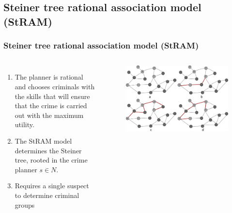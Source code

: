 \documentclass[aspectratio=169]{beamer}
\begin{document}
\subsection{Steiner tree rational association model (StRAM)}
\begin{frame}
\frametitle{Steiner tree rational association model (StRAM)}
  \begin{columns}
    \begin{enumerate}
      \item<1-> The planner is rational and chooses criminals with the skills that will ensure that the crime is carried out with the maximum utility.
      \item<2-> The StRAM model determines the Steiner tree, rooted in the crime planner $s \in N$.
      \item<3-> Requires a single suspect to determine criminal groups
    \end{enumerate}
    \begin{figure}[ht]
      \centering
      \includegraphics[width=\textwidth]{images/stram-network.pdf}
    \end{figure}
  \end{columns}
\end{frame}
\end{document}
